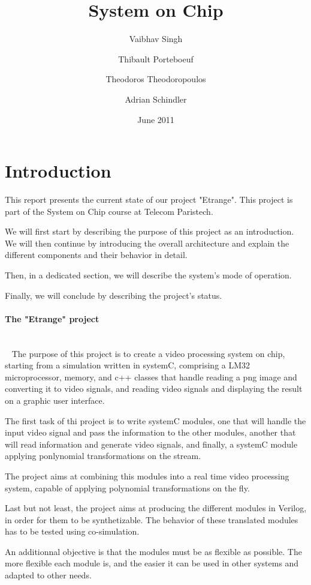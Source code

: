 \documentclass[a4paper,10pt]{article}
\begin{document}
\title{System on Chip}

\author{Vaibhav Singh \and Thibault Porteboeuf \and Theodoros
Theodoropoulos \and Adrian Schindler}

\date{June 2011}
\maketitle

\tableofcontents

\section{Introduction} 

This report presents the current state of our project "Etrange". This project is part of the System on Chip course at Telecom Paristech.

We will first start by describing the purpose of this project as an introduction. We will then continue by introducing the overall architecture and explain the different components and their behavior in detail.

Then, in a dedicated section, we will describe the system's mode of operation.

Finally, we will conclude by describing the project's status.


\paragraph{The "Etrange" project}
~\\~
The purpose of this project is to create a video processing system on chip, starting from a simulation written in systemC, comprising a LM32 microprocessor, memory, and c++ classes that handle reading a png image and converting it to video signals, and reading video signals and displaying the result on a graphic user interface.

The first task of thi project is to write systemC modules, one that will handle the input video signal and pass the information to the other modules, another that will read information and generate video signals, and finally, a systemC module applying ponlynomial transformations on the stream.

The project aims at combining this modules into a real time video processing system, capable of applying polynomial transformations on the fly.

Last but not least, the project aims at producing the different modules in Verilog, in order for them to be synthetizable. The behavior of these translated modules has to be tested using co-simulation.

An additionnal objective is that the modules must be as flexible as possible. The more flexible each module is, and the easier it can be used in other systems and adapted to other needs.







\end{document}
